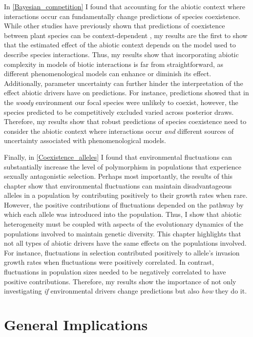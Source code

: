 \begin{refsection}
In \autoref{Bayesian_competition} I found that accounting for the abiotic context where interactions occur can fundamentally change predictions of species coexistence. While other studies have previously shown that predictions of coexistence between plant species can be context-dependent \citep{bimler_accurate_2018,lanuza_opposing_2018}, my results are the first to show that the estimated effect of the abiotic context depends on the model used to describe species interactions. Thus, my results show that incorporating abiotic complexity in models of biotic interactions is far from straightforward, as different phenomenological models can enhance or diminish its effect. Additionally, parameter uncertainty can further hinder the interpretation of the effect abiotic drivers have on predictions. For instance, predictions showed that in the \textit{woody} environment our focal species were unlikely to coexist, however, the species predicted to be competitively excluded varied across posterior draws. Therefore, my results show that robust predictions of species coexistence need to consider the abiotic context where interactions occur \textit{and} different sources of uncertainty associated with phenomenological models.

Finally, in \autoref{Coexistence_alleles} I found that environmental fluctuations can substantially increase the level of polymorphism in populations that experience sexually antagonistic selection. Perhaps most importantly, the results of this chapter show that environmental fluctuations can maintain disadvantageous alleles in a population by contributing positively to their growth rates when rare. However, the positive contributions of fluctuations depended on the pathway by which each allele was introduced into the population. Thus, I show that abiotic heterogeneity must be coupled with aspects of the evolutionary dynamics of the populations involved to maintain genetic diversity. This chapter highlights that not all types of abiotic drivers have the same effects on the populations involved. For instance, fluctuations in selection contributed positively to allele's invasion growth rates when fluctuations were positively correlated. In contrast, fluctuations in population sizes needed to be negatively correlated to have positive contributions. Therefore, my results show the importance of not only investigating \textit{if} environmental drivers change predictions but also \textit{how} they do it.


\section*{General Implications}


\end{refsection}
